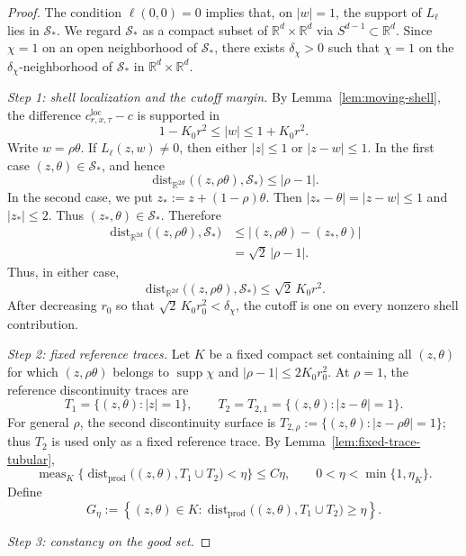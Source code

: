 \documentclass[11pt]{article}
\theoremstyle{remark}
\numberwithin{equation}{section}
\begin{document}
\begin{proof}
The condition $\ell(0,0)=0$ implies that, on $|w|=1$, the support of
$L_\ell$ lies in $\mathcal S_*$.  We regard
$\mathcal S_*$ as a compact subset of
$\mathbb R^d\times\mathbb R^d$ via
$S^{d-1}\subset\mathbb R^d$.  Since $\chi=1$ on an open neighborhood
of $\mathcal S_*$, there exists $\delta_\chi>0$ such that
$\chi=1$ on the $\delta_\chi$-neighborhood of $\mathcal S_*$ in
$\mathbb R^d\times\mathbb R^d$.

\emph{Step 1: shell localization and the cutoff margin.}
By Lemma~\ref{lem:moving-shell}, the difference
$c_{r,x,\tau}^{\mathrm{loc}}-c$ is supported in
\[
1-K_0r^2\le |w|\le1+K_0r^2.
\]
Write $w=\rho\theta$.  If $L_\ell(z,w)\ne0$, then either $|z|\le1$ or
$|z-w|\le1$.  In the first case $(z,\theta)\in\mathcal S_*$, and hence
\[
\operatorname{dist}_{\mathbb R^{2d}}
\bigl((z,\rho\theta),\mathcal S_*\bigr)
\le |\rho-1|.
\]
In the second case, we put
$z_*:=z+(1-\rho)\theta$.
Then
$|z_*-\theta|=|z-w|\le1$
and 
$|z_*|\le2$. Thus $(z_*,\theta)\in\mathcal S_*$.  Therefore
\[
\begin{aligned}
\operatorname{dist}_{\mathbb R^{2d}}
\bigl((z,\rho\theta),\mathcal S_*\bigr)
&\le
\left|(z,\rho\theta)-(z_*,\theta)\right|\\
&=
\sqrt2\,|\rho-1|.
\end{aligned}
\]
Thus, in either case,
\[
\operatorname{dist}_{\mathbb R^{2d}}
\bigl((z,\rho\theta),\mathcal S_*\bigr)
\le
\sqrt2\,K_0r^2.
\]
After decreasing $r_0$ so that
$\sqrt2\,K_0r_0^2<\delta_\chi$, the cutoff is one on every nonzero
shell contribution.



\emph{Step 2: fixed reference traces.}
Let $K$ be a fixed compact set containing all $(z,\theta)$ for which
$(z,\rho\theta)$ belongs to $\operatorname{supp}\chi$ and
$|\rho-1|\le2K_0r_0^2$.  At $\rho=1$, the reference discontinuity traces are
\[
T_1=\{(z,\theta):|z|=1\},\qquad
T_2=T_{2,1}=\{(z,\theta):|z-\theta|=1\}.
\]
For general $\rho$, the second discontinuity surface is
$T_{2,\rho}:=\{(z,\theta):|z-\rho\theta|=1\}$; thus $T_2$ is used only as a
fixed reference trace.  By Lemma~\ref{lem:fixed-trace-tubular},
\[
\operatorname{meas}_K\{\operatorname{dist}_{\mathrm{prod}}
\bigl((z,\theta),T_1\cup T_2\bigr)<\eta\}
\le C\eta,
\qquad 0<\eta<\min\{1,\eta_K\}.
\]
Define
\[
G_\eta
:=
\left\{
(z,\theta)\in K:
\operatorname{dist}_{\mathrm{prod}}
\bigl((z,\theta),T_1\cup T_2\bigr)\ge\eta
\right\}.
\]

\emph{Step 3: constancy on the good set.}


\end{proof}
\end{document}
